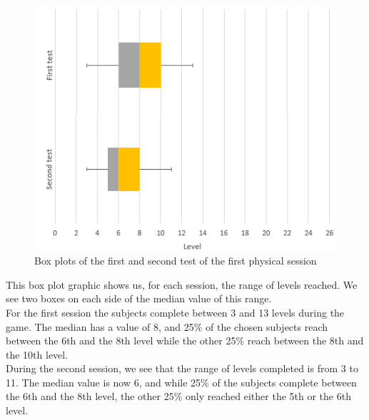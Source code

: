 \documentclass[12pt, openany, twocolumn]{article}
\begin{document}
        \begin{figure}
            \includegraphics[scale=0.74]{graphics/boxplot-p-firstandsecondtest.png}
            \caption{Box plots of the first and second test of the first physical session}
        \end{figure}
        
        This box plot graphic shows us, for each session, the range of levels reached. We see two boxes on each side of the median value of this range. \\
        For the first session the subjects complete between 3 and 13 levels during the game. The median has a value of 8, and 25\% of the chosen subjects reach between the 6th and
        the 8th level while the other 25\% reach between the 8th and the 10th level. \\
        During the second session, we see that the range of levels completed is from 3 to 11. The median value is now 6, and while 25\% of the subjects complete between the 6th and the 8th level,
        the other 25\% only reached either the 5th or the 6th level. \\



\end{document}
